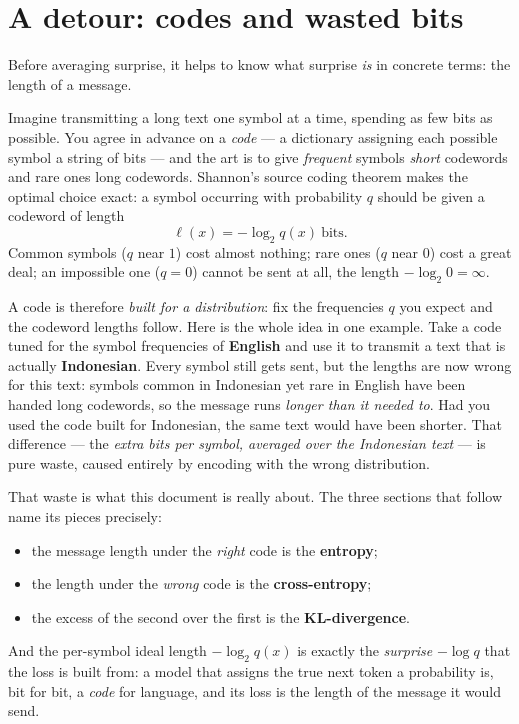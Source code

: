 \documentclass[11pt]{article}
\begin{document}
\section{A detour: codes and wasted bits}

Before averaging surprise, it helps to know what surprise \emph{is} in concrete terms: the
length of a message.

Imagine transmitting a long text one symbol at a time, spending as few bits as possible. You
agree in advance on a \emph{code} --- a dictionary assigning each possible symbol a string of
bits --- and the art is to give \emph{frequent} symbols \emph{short} codewords and rare ones
long codewords. Shannon's source coding theorem makes the optimal choice exact: a symbol
occurring with probability $q$ should be given a codeword of length
\[
  \ell(x) = -\log_2 q(x) \ \text{bits}.
\]
Common symbols ($q$ near $1$) cost almost nothing; rare ones ($q$ near $0$) cost a great deal;
an impossible one ($q = 0$) cannot be sent at all, the length $-\log_2 0 = \infty$.

A code is therefore \emph{built for a distribution}: fix the frequencies $q$ you expect and the
codeword lengths follow. Here is the whole idea in one example. Take a code tuned for the
symbol frequencies of \textbf{English} and use it to transmit a text that is actually
\textbf{Indonesian}. Every symbol still gets sent, but the lengths are now wrong for this
text: symbols common in Indonesian yet rare in English have been handed long codewords, so the
message runs \emph{longer than it needed to}. Had you used the code built for Indonesian, the
same text would have been shorter. That difference --- the \emph{extra bits per symbol,
averaged over the Indonesian text} --- is pure waste, caused entirely by encoding with the
wrong distribution.

That waste is what this document is really about. The three sections that follow name its
pieces precisely:
\begin{itemize}[leftmargin=1.4em]
  \item the message length under the \emph{right} code is the \textbf{entropy};
  \item the length under the \emph{wrong} code is the \textbf{cross-entropy};
  \item the excess of the second over the first is the \textbf{KL-divergence}.
\end{itemize}
And the per-symbol ideal length $-\log_2 q(x)$ is exactly the \emph{surprise} $-\log q$ that
the loss is built from: a model that assigns the true next token a probability is, bit for
bit, a \emph{code} for language, and its loss is the length of the message it would send.
\end{document}
